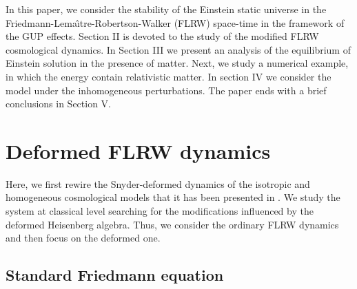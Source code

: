 \documentclass[showpacs,amsmath,nofootinbib,amssymb,epsfig]{revtex4}
\begin{document}
In this paper, we consider the stability of the Einstein static universe in the Friedmann-Lema\^{\i}tre-Robertson-Walker (FLRW) space-time in the
framework of the GUP effects. Section II is devoted to the study of the modified FLRW cosmological dynamics. In Section III we present an analysis of the equilibrium of Einstein solution in the presence of matter. Next, we study a numerical example,
in which the energy contain relativistic matter. In section IV we consider the model under the inhomogeneous perturbations. The paper ends with a brief conclusions in Section V.



\section{Deformed FLRW dynamics}

Here, we first rewire the Snyder-deformed dynamics of the isotropic and homogeneous cosmological models that it has been presented in \cite{marco}. We study the system at classical level searching for the modifications influenced by the deformed Heisenberg algebra. Thus, we consider the ordinary FLRW dynamics and then focus on the deformed one.

\subsection{Standard Friedmann equation}
\end{document}
